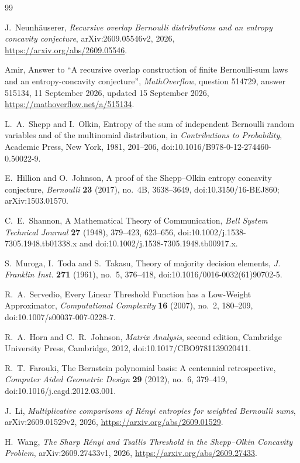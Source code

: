 \documentclass[11pt,a4paper]{article}
\numberwithin{equation}{section}
\theoremstyle{remark}
\begin{document}
\begin{thebibliography}{99}

 J.~Neunh\"auserer, \emph{Recursive overlap Bernoulli distributions and an entropy concavity conjecture}, arXiv:2609.05546v2, 2026, \url{https://arxiv.org/abs/2609.05546}.

 Amir, Answer to ``A recursive overlap construction of finite Bernoulli-sum laws and an entropy-concavity conjecture'', \emph{MathOverflow}, question 514729, answer 515134, 11 September 2026, updated 15 September 2026, \url{https://mathoverflow.net/a/515134}.

 L.~A.~Shepp and I.~Olkin, Entropy of the sum of independent Bernoulli random variables and of the multinomial distribution, in \emph{Contributions to Probability}, Academic Press, New York, 1981, 201--206, doi:10.1016/B978-0-12-274460-0.50022-9.

 E.~Hillion and O.~Johnson, A proof of the Shepp--Olkin entropy concavity conjecture, \emph{Bernoulli} \textbf{23} (2017), no.~4B, 3638--3649, doi:10.3150/16-BEJ860; arXiv:1503.01570.

 C.~E.~Shannon, A Mathematical Theory of Communication, \emph{Bell System Technical Journal} \textbf{27} (1948), 379--423, 623--656, doi:10.1002/j.1538-7305.1948.tb01338.x and doi:10.1002/j.1538-7305.1948.tb00917.x.

 S.~Muroga, I.~Toda and S.~Takasu, Theory of majority decision elements, \emph{J. Franklin Inst.} \textbf{271} (1961), no.~5, 376--418, doi:10.1016/0016-0032(61)90702-5.

 R.~A.~Servedio, Every Linear Threshold Function has a Low-Weight Approximator, \emph{Computational Complexity} \textbf{16} (2007), no.~2, 180--209, doi:10.1007/s00037-007-0228-7.

 R.~A.~Horn and C.~R.~Johnson, \emph{Matrix Analysis}, second edition, Cambridge University Press, Cambridge, 2012, doi:10.1017/CBO9781139020411.

 R.~T.~Farouki, The Bernstein polynomial basis: A centennial retrospective, \emph{Computer Aided Geometric Design} \textbf{29} (2012), no.~6, 379--419, doi:10.1016/j.cagd.2012.03.001.

 J.~Li, \emph{Multiplicative comparisons of R\'enyi entropies for weighted Bernoulli sums}, arXiv:2609.01529v2, 2026, \url{https://arxiv.org/abs/2609.01529}.

 H.~Wang, \emph{The Sharp R\'enyi and Tsallis Threshold in the Shepp--Olkin Concavity Problem}, arXiv:2609.27433v1, 2026, \url{https://arxiv.org/abs/2609.27433}.


\end{thebibliography}
\end{document}

